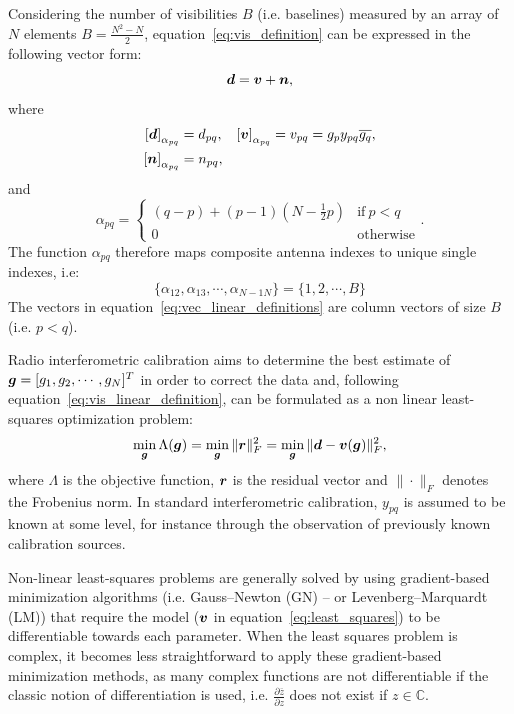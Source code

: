 \documentclass[useAMS,usenatbib]{mn2e}
\newcommand{\br}{\bmath{r}}
\newcommand{\bg}{\bmath{g}}
\newcommand{\bd}{\bmath{d}}
\newcommand{\bv}{\bmath{v}}
\newcommand{\bn}{\bmath{n}}
\newcommand{\conj}[1]{\overline{#1}}
\begin{document}
Considering the number of visibilities $B$ (i.e. baselines) measured by an array of $N$ elements $B = \frac{N^2-N}{2}$, equation~\ref{eq:vis_definition} can be expressed in the following vector form:
\begin{equation}
\label{eq:vis_linear_definition}
\bd = \bv + \bn, 
\end{equation}
where 
\begin{align}
 \left [ \bd \right]_{\alpha_{pq}} &= d_{pq}, & \left [ \bv \right ]_{\alpha_{pq}} &= v_{pq}=g_p y_{pq} \conj{g_q},\nonumber\\
 \left [ \bn \right ]_{\alpha_{pq}} &= n_{pq}, &  &\label{eq:vec_linear_definitions}
\end{align}
and 
\begin{equation}
\alpha_{pq} =
\begin{cases}
(q-p) + (p-1)\left (N-\frac{1}{2}p \right ) & \textrm{if}~p<q\\
0 & \textrm{otherwise}
\end{cases}.
\end{equation}
The function $\alpha_{pq}$ therefore maps composite antenna indexes to unique single indexes, i.e:
\begin{equation}
\{\alpha_{12},\alpha_{13},\cdots,\alpha_{N-1N}\} = \{1,2,\cdots,B\} 
\end{equation}
The vectors in equation~\ref{eq:vec_linear_definitions} are column vectors of size $B$ (i.e. $p<q$).

Radio interferometric calibration aims to determine the best estimate of $\bg = [g_1,g_2,\cdots,g_N]^T$ in order to correct the data and, following equation~\ref{eq:vis_linear_definition}, can be formulated as a non linear least-squares optimization problem:
\begin{equation}
\label{eq:least_squares}
\min_{\bg} \Lambda(\bg) = \min_{\bg} \|\br\|_F^2 = \min_{\bg} \|\bd - \bv(\bg)\|_F^2, 
\end{equation}
where $\Lambda$ is the objective function, $\br$ is the residual vector and $\|\cdot\|_F$ denotes the Frobenius norm. In standard interferometric calibration, $y_{pq}$ is assumed to be known at some level, for instance through the observation of previously known calibration sources. 

Non-linear least-squares problems are generally solved by using gradient-based minimization algorithms (i.e. Gauss--Newton (GN) -- or Levenberg--Marquardt (LM)) that require the model ($\bv$ in equation~\ref{eq:least_squares}) to be differentiable towards each parameter. 
When the least squares problem is complex, it becomes less straightforward to apply these gradient-based minimization methods, as
many complex functions are not differentiable if the classic notion of differentiation is used, i.e. $\frac{\partial \conj{z}}{\partial z}$ does not exist if $z \in \mathbb{C}$.
\end{document}
